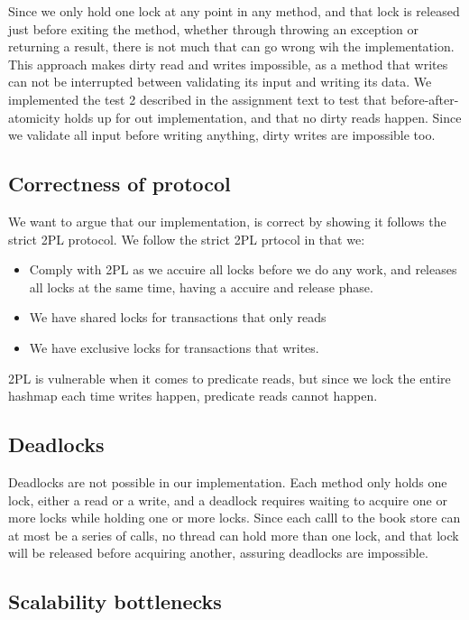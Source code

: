 \documentclass{article}
\theoremstyle{plain}
\theoremstyle{nonumberplain}
\begin{document}
Since we only hold one lock at any point in any method, and that lock is released just before exiting the method, whether through throwing an exception or returning a result, there is not much that can go wrong wih the implementation. This approach makes dirty read and writes impossible, as a method that writes can not be interrupted between validating its input and writing its data. We implemented the test  2 described in the assignment text to test that before-after-atomicity holds up for out implementation, and that no dirty reads happen. Since we validate all input before writing anything, dirty writes are impossible too.

\subsection{Correctness of protocol}

We want to argue that our implementation, is correct by showing it follows the strict 2PL protocol.
We follow the strict 2PL prtocol in that we:
\begin{itemize}
\item Comply with 2PL as we accuire all locks before we do any work, and releases all locks at the same time, having a accuire and release phase. 
\item We have shared locks for transactions that only reads
\item We have exclusive locks for transactions that writes. 
\end{itemize}

2PL is vulnerable when it comes to predicate reads, but since we lock the entire hashmap each time writes happen, predicate reads cannot happen. 

\subsection{Deadlocks}

Deadlocks are not possible in our implementation. Each method only holds one lock, either a read or a write, and a deadlock requires waiting to acquire one or more locks while holding one or more locks. Since each calll to the book store can at most be a series of calls, no thread can hold more than one lock, and that lock will be released before acquiring another, assuring deadlocks are impossible.

\subsection{Scalability bottlenecks}
\end{document}
